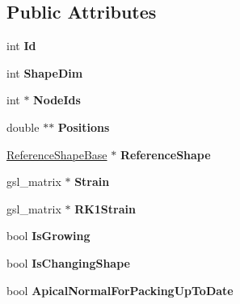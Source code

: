 \subsection*{Public Attributes}
\begin{DoxyCompactItemize}
\item 
\hypertarget{classShapeBase_ae097764dd4d607b54710d7ca0f7e12f8}{}int {\bfseries Id}\label{classShapeBase_ae097764dd4d607b54710d7ca0f7e12f8}

\item 
\hypertarget{classShapeBase_a4d740b60433d7a9104c2d09b0d52703d}{}int {\bfseries Shape\+Dim}\label{classShapeBase_a4d740b60433d7a9104c2d09b0d52703d}

\item 
\hypertarget{classShapeBase_a870e519202c84ef5a81fd35b059fdebe}{}int $\ast$ {\bfseries Node\+Ids}\label{classShapeBase_a870e519202c84ef5a81fd35b059fdebe}

\item 
\hypertarget{classShapeBase_ad6aa109b1f9c10680a0b601452bc78c2}{}double $\ast$$\ast$ {\bfseries Positions}\label{classShapeBase_ad6aa109b1f9c10680a0b601452bc78c2}

\item 
\hypertarget{classShapeBase_a4aee3861aaca88cf1b8e5bdc1ff7c872}{}\hyperlink{classReferenceShapeBase}{Reference\+Shape\+Base} $\ast$ {\bfseries Reference\+Shape}\label{classShapeBase_a4aee3861aaca88cf1b8e5bdc1ff7c872}

\item 
\hypertarget{classShapeBase_a4bda00f80968d836c647afe5f6d1fb36}{}gsl\+\_\+matrix $\ast$ {\bfseries Strain}\label{classShapeBase_a4bda00f80968d836c647afe5f6d1fb36}

\item 
\hypertarget{classShapeBase_a260226b84c840503ce7da99bfeedc57b}{}gsl\+\_\+matrix $\ast$ {\bfseries R\+K1\+Strain}\label{classShapeBase_a260226b84c840503ce7da99bfeedc57b}

\item 
\hypertarget{classShapeBase_a41ddcfda39fe0be356a512b48b31e29e}{}bool {\bfseries Is\+Growing}\label{classShapeBase_a41ddcfda39fe0be356a512b48b31e29e}

\item 
\hypertarget{classShapeBase_a994acea5e6f2cf92c94f485e7ba5afc9}{}bool {\bfseries Is\+Changing\+Shape}\label{classShapeBase_a994acea5e6f2cf92c94f485e7ba5afc9}

\item 
\hypertarget{classShapeBase_ac2bab1161a08d0d953702b7c8d1ff032}{}bool {\bfseries Apical\+Normal\+For\+Packing\+Up\+To\+Date}\label{classShapeBase_ac2bab1161a08d0d953702b7c8d1ff032}


\end{DoxyCompactItemize}
